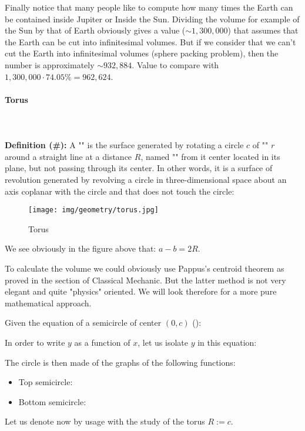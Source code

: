 {	Finally notice that many people like to compute how many times the Earth can be contained inside Jupiter or Inside the Sun. Dividing the volume for example of the Sun by that of Earth obviously gives a value ($\sim 1,300,000$) that assumes that the Earth can be cut into infinitesimal volumes. But if we consider that we can't cut the Earth into infinitesimal volumes (sphere packing problem), then the number is approximately $\sim 932,884$. Value to compare with $1,300,000\cdot 74.05\%=962,624$.
	
	\pagebreak
	\paragraph{Torus}\mbox{}\\\\
	\textbf{Definition (\#\mydef):} A "" is the surface generated by rotating a circle $c$ of "" $r$ around a straight line at a distance $R$, named "" from it center located in its plane, but not passing through its center. In other words,  it is a surface of revolution generated by revolving a circle in three-dimensional space about an axis coplanar with the circle and that does not touch the circle:
	\begin{figure}[H]
		\centering
		\texttt{[image: img/geometry/torus.jpg]}
		\caption{Torus}
	\end{figure}
	We see obviously in the figure above that: $a-b=2R$.
	
	To calculate the volume we could obviously use Pappus's centroid theorem as proved in the section of Classical Mechanic. But the latter method is not very elegant and quite "physics" oriented. We will look therefore for a more pure mathematical approach.
	
	Given the equation of a semicircle of center $(0, c)$ ():
	
	In order to write $y$ as a function of $x$, let us isolate $y$ in this equation:
	
	The circle is then made of the graphs of the following functions:
	\begin{itemize} 
		\item Top semicircle:
		

		\item Bottom semicircle:
		
	\end{itemize}
	Let us denote now by usage with the study of the torus $R:=c$.
	
}
